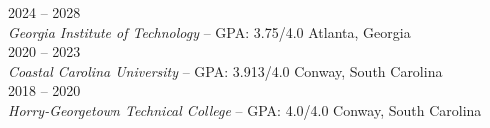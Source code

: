 	\hfill 2024 -- 2028 \\
\textit{Georgia Institute of Technology} -- GPA: 3.75/4.0    \hfill Atlanta, Georgia \\ 

	\hfill 2020 -- 2023 \\
\textit{Coastal Carolina University} -- GPA: 3.913/4.0    \hfill Conway, South Carolina \\ 

   \hfill	2018 -- 2020 \\ 
\textit{Horry-Georgetown Technical College} -- GPA: 4.0/4.0 \hfill Conway, South Carolina \\ 

